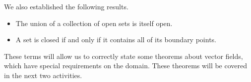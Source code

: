 \documentclass{ximera}
\begin{document}
We also established the following results.
\begin{itemize}
\item The union of a collection of open sets is itself open.
\item A set is closed if and only if it contains all of its boundary points.
\end{itemize}

These terms will allow us to correctly state some theorems about vector fields, which have special requirements on the domain. These theorems will be covered in the next two activities.
\end{document}
